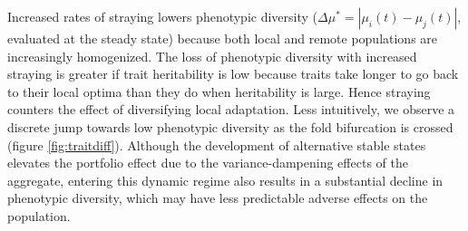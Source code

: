 \documentclass[twocolumn,preprintnumbers,amsmath,amssymb,superscriptaddress]{revtex4}
\begin{document}
Increased rates of straying lowers phenotypic diversity ($\Delta \mu^* = |\mu_i(t)-\mu_j(t)|$, evaluated at the steady state) because both local and remote populations are increasingly homogenized.
The loss of phenotypic diversity with increased straying is greater if trait heritability is low because traits take longer to go back to their local optima than they do when heritability is large. 
Hence straying counters the effect of diversifying local adaptation. 
Less intuitively, we observe a discrete jump towards low phenotypic diversity as the fold bifurcation is crossed (figure \ref{fig:traitdiff}).
Although the development of alternative stable states elevates the portfolio effect due to the variance-dampening effects of the aggregate, entering this dynamic regime also results in a substantial decline in phenotypic diversity, which may have less predictable adverse effects on the population. 
\\
\end{document}
